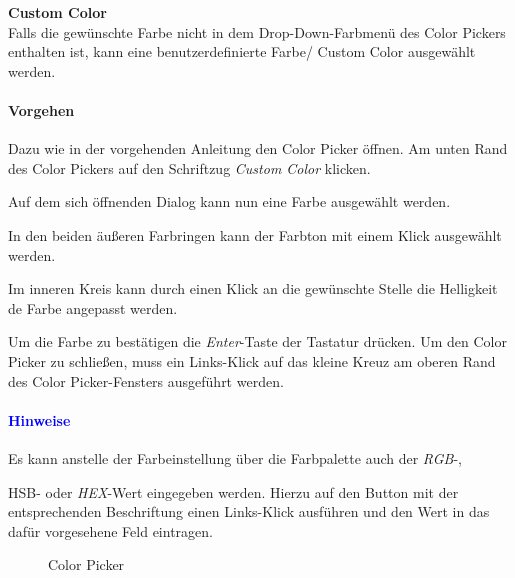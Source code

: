 \documentclass[enabledeprecatedfontcommands,fontsize=11pt,paper=a4,twoside]{scrartcl}
\newcounter{one}
\newcounter{two}[one]
\newcommand*{\hint}{\paragraph{\textcolor{blue}{Hinweise}}}
\newcommand*{\action}{\paragraph{Vorgehen}}
\let\tempone\itemize
\let\temptwo\enditemize
\renewenvironment{itemize}{\tempone\addtolength{\itemsep}{-10.0pt}}{\temptwo}
\let\origenumerate\enumerate
\let\origendenumerate\endenumerate
\renewenvironment{enumerate}{\origenumerate \addtolength{\itemsep}{-10.0pt}}{\origendenumerate}
\begin{document}
\textbf{Custom Color}\\
Falls die gewünschte Farbe nicht in dem Drop-Down-Farbmenü des Color Pickers enthalten ist, kann eine benutzerdefinierte Farbe/ Custom Color ausgewählt werden. 
\action
\begin{enumerate}
	\item Dazu wie in der vorgehenden Anleitung den Color Picker öffnen. Am unten Rand des Color Pickers auf den Schriftzug \textit{Custom Color} klicken. 
	\item Auf dem sich öffnenden Dialog kann nun eine Farbe ausgewählt werden. 
	\item In den beiden äußeren Farbringen kann der Farbton mit einem Klick ausgewählt werden.
	\item Im inneren Kreis kann durch einen Klick an die gewünschte Stelle die Helligkeit de Farbe angepasst werden.
	\item Um die Farbe zu bestätigen die \textit{Enter}-Taste der Tastatur drücken. Um den Color Picker zu schließen, muss ein Links-Klick auf das kleine Kreuz am oberen Rand des Color Picker-Fensters ausgeführt werden.
\end{enumerate} 
\hint
\begin{itemize}
	\item Es kann anstelle der Farbeinstellung über die Farbpalette auch der \textit{RGB}-, \item{HSB}- oder \textit{HEX}-Wert eingegeben werden. Hierzu auf den Button mit der entsprechenden Beschriftung einen Links-Klick ausführen und den Wert in das dafür vorgesehene Feld eintragen.
\end{itemize} 

\begin{figure}[ht!]
	\centering
	\caption{Color Picker}	
\end{figure}
\end{document}

